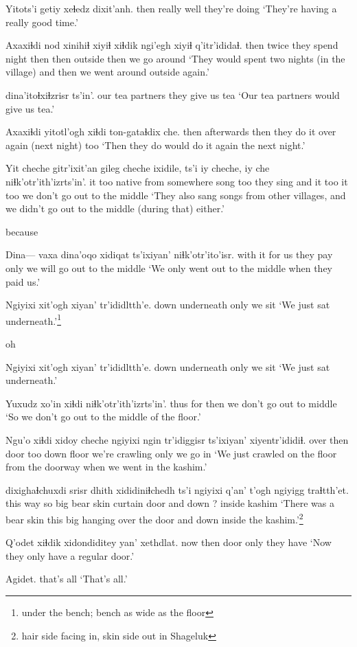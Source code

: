 \documentclass[12pt]{article}
\begin{document}
\gll Yitots'i getiy xeɬedz dixit'anh.
then  really well {they're doing}
\glt `They're having a really good time.'
\glend

\gll Axaxiɬdi nod xinihiɬ xiyiɬ xiɬdik ngi'egh xiyiɬ q'itr'ididaɬ.
then     {twice} {they spend night} then then outside then {we go around}
\glt `They would spent two nights (in the village) and then we went around outside again.'
\glend

 dina'itoɬxiɬzrisr ts'in'.
{our tea partners} {they give us tea}
\glt `Our tea partners would give us tea.'
\glend

\gll Axaxiɬdi yitotl'ogh xiɬdi ton-gataɬdix   che.
then     {afterwards} then {they do it over again (next night)} too 
\glt `Then they do would do it again the next night.'
\glend

\gll Yit cheche gitr'ixit'an      gileg cheche ixidile, ts'i iy cheche, iy che {niɬk'otr'ith'izrts'in'}.
it too {native from somewhere} song too {they sing} and it too it too {we don't go out to the middle}
\glt `They also sang songs from other villages, and we didn't go out to the middle (during that) either.'
\glend

because

\gll Dina--- vaxa    dina'oqo xidiqat ts'ixiyan' niɬk'otr'ito'isr.
{}    {with it} {for us} {they pay}  only  {we will go out to the middle}
\glt `We only went out to the middle when they paid us.'
\glend

\gll Ngiyixi xit'ogh xiyan' tr'ididltth'e.
down    underneath only {we sit}
\glt `We just sat underneath.'\footnote{under the bench; bench as wide as the floor}
\glend

oh

\gll Ngiyixi xit'ogh xiyan' tr'ididltth'e.
down    underneath only {we sit}
\glt `We just sat underneath.'
\glend

\gll Yuxudz xo'in xiɬdi {niɬk'otr'ith'izrts'in'.}
thus   for   then   {we don't go out to middle}
\glt `So we don't go out to the middle of the floor.'
\glend

\gll Ngu'o xiɬdi xidoy cheche ngiyixi ngin tr'idiggisr ts'ixiyan' xiyentr'ididiɬ.
over  then  door  too    down    floor  {we're crawling} only {we go in}
\glt `We just crawled on the floor from the doorway when we went in the kashim.'
\glend

 dixighaɬchuxdi srisr dhith xididiniɬchedh ts'i ngiyixi {q'an' t'ogh} ngiyigg traɬtth'et.
{this way} {so big}      bear skin   {curtain door} and  down   ? inside kashim
\glt `There was a bear skin this big hanging over the door and down inside the kashim.'\footnote{hair side facing in, skin side out in Shageluk}
\glend

\gll Q'odet xiɬdik xidondiditey yan' xethdlat.
now   then door  only  {they have}
\glt `Now they only have a regular door.'
\glend

\gll Agidet.
{{that's all}}
\glt `That's all.'
\glend
\end{document}
